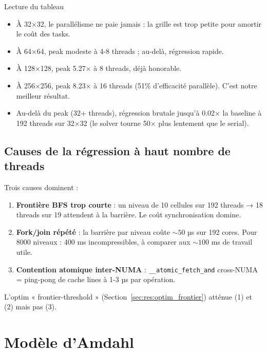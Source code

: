 \begin{important}{Lecture du tableau}
\begin{itemize}
    \item À 32×32, le parallélisme ne paie jamais : la grille est trop petite pour amortir le coût des tasks.
    \item À 64×64, peak modeste à 4-8 threads ; au-delà, régression rapide.
    \item À 128×128, peak 5.27× à 8 threads, déjà honorable.
    \item À 256×256, peak 8.23× à 16 threads (51\% d'efficacité parallèle). C'est notre meilleur résultat.
    \item Au-delà du peak (32+ threads), régression brutale jusqu'à 0.02× la baseline à 192 threads sur 32×32 (le solver tourne 50× plus lentement que le serial).
\end{itemize}
\end{important}

\subsection{Causes de la régression à haut nombre de threads}

Trois causes dominent :

\begin{enumerate}
    \item \textbf{Frontière BFS trop courte} : un niveau de 10 cellules sur 192 threads → 18 threads sur 19 attendent à la barrière. Le coût synchronisation domine.

    \item \textbf{Fork/join répété} : la barrière par niveau coûte $\sim 50$ µs sur 192 cores. Pour 8000 niveaux : 400 ms incompressibles, à comparer aux $\sim 100$ ms de travail utile.

    \item \textbf{Contention atomique inter-NUMA} : \texttt{\_\_atomic\_fetch\_and} cross-NUMA = ping-pong de cache lines à 1-3 µs par opération.
\end{enumerate}

L'optim « frontier-threshold » (Section~\ref{sec:res:optim_frontier}) atténue (1) et (2) mais pas (3).

\section{Modèle d'Amdahl}
\label{sec:res:amdahl}

